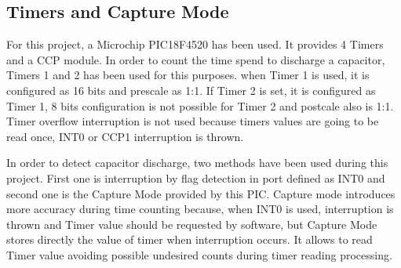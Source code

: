 \subsection{Timers and Capture Mode}\label{S:Res:Code:Timers}
For this project, a Microchip PIC18F4520 has been used. It provides 4 Timers and a CCP  module. In order to count the time spend to discharge a capacitor, Timers 1 and 2 has been used for this purposes. when Timer 1 is used, it is configured as 16 bits and prescale as 1:1. If Timer 2 is set, it is configured as Timer 1, 8 bits configuration is not possible for Timer 2 and postcale also is 1:1. Timer overflow interruption is not used because timers values are going to be read once, INT0 or CCP1 interruption is thrown.

In order to detect capacitor discharge, two methods have been used during this project. First one is interruption by flag detection in port defined as INT0 and second one is the Capture Mode provided by this PIC. Capture mode introduces more accuracy during time counting because, when INT0 is used, interruption is thrown and Timer value should be requested by software, but Capture Mode stores directly the value of timer when interruption occurs. It allows to read Timer value avoiding possible undesired counts during timer reading processing.
